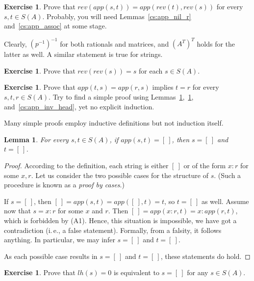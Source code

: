 \documentclass[12pt,notitlepage]{article}
\theoremstyle{plain}
\newtheorem{lemma}[thm]{Lemma}
\theoremstyle{definition}
\newtheorem{exc}[thm]{Exercise}
\theoremstyle{plain}
\newcommand{\1}{\mathbf{1}}
\newcommand{\0}{\mathbf{0}}
\begin{document}
\begin{exc}\label{cs:rev_app_distr}
Prove that $rev(app(s,t)) = app(rev(t), rev(s))$ for every $s, t \in S(A)$. Probably, you will need Lemmas~\ref{cs:app_nil_r} and~\ref{cs:app_assoc} at some stage.
\end{exc}

Clearly, $(p^{-1})^{-1}$ for both rationals and matrices, and $(A^T)^T$ holds for the latter as well. A similar statement is true for strings.
\begin{exc}\label{cs:rev_involutive}
Prove that $rev(rev(s)) = s$ for each $s \in S(A)$.
\end{exc}

\begin{exc}
Prove that $app(t,s) = app(r,s)$ implies $t = r$ for every $s, t, r \in S(A)$. Try to find a simple proof using Lemmas~\ref{cs:rev_involutive},~\ref{cs:rev_app_distr}, and~\ref{cs:app_inv_head}, yet no explicit induction.
\end{exc}

Many simple proofs employ inductive definitions but not induction itself.
\begin{lemma}\label{cs:app_eq_nil}
For every $s,t \in S(A)$, if $app(s,t) = [\ ]$, then $s = [\ ]$ and $t = [\ ]$.
\end{lemma}
\begin{proof}
According to the definition, each string is either $[\ ]$ or of the form $x : r$ for some $x, r$. Let us consider the two possible cases for the structure of $s$. (Such a procedure is known as a \emph{proof by cases}.)

If $s = [\ ]$, then $[\ ] = app(s,t) = app([\ ], t) = t$, so $t = [\ ]$ as well. Assume now that $s = x : r$ for some $x$ and $r$. Then $[\ ] = app(x:r, t) = x : app(r, t)$, which is forbidden by (A1). Hence, this situation is impossible, we have got a contradiction (i.\,e., a false statement). Formally, from a falsity, it follows anything. In particular, we may infer $s = [\ ]$ and $t = [\ ]$.

As each possible case results in $s = [\ ]$ and $t = [\ ]$, these statements do hold.
\end{proof}

\begin{exc}
Prove that $lh(s) = 0$ is equivalent to  $s = [\ ]$ for any $s \in S(A)$.
\end{exc}
\end{document}
